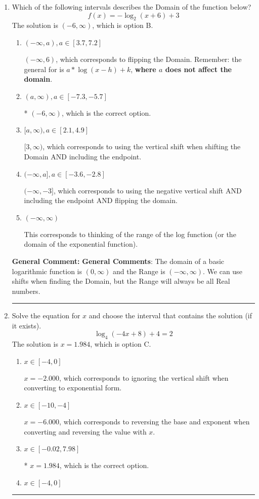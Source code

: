 \documentclass{extbook}[14pt]
\newcommand{\litem}[1]{\item #1

\rule{\textwidth}{0.4pt}}
\begin{document}
\begin{enumerate}\litem{
Which of the following intervals describes the Domain of the function below?
\[ f(x) = -\log_2{(x+6)}+3 \]The solution is \( (-6, \infty) \), which is option B.\begin{enumerate}[label=\Alph*.]
\item \( (-\infty, a), a \in [3.7, 7.2] \)

$(-\infty, 6)$, which corresponds to flipping the Domain. Remember: the general for is $a*\log(x-h)+k$, \textbf{where $a$ does not affect the domain}.
\item \( (a, \infty), a \in [-7.3, -5.7] \)

* $(-6, \infty)$, which is the correct option.
\item \( [a, \infty), a \in [2.1, 4.9] \)

$[3, \infty)$, which corresponds to using the vertical shift when shifting the Domain AND including the endpoint.
\item \( (-\infty, a], a \in [-3.6, -2.8] \)

$(-\infty, -3]$, which corresponds to using the negative vertical shift AND including the endpoint AND flipping the domain.
\item \( (-\infty, \infty) \)

This corresponds to thinking of the range of the log function (or the domain of the exponential function).
\end{enumerate}

\textbf{General Comment:} \textbf{General Comments}: The domain of a basic logarithmic function is $(0, \infty)$ and the Range is $(-\infty, \infty)$. We can use shifts when finding the Domain, but the Range will always be all Real numbers.
}
\litem{
Solve the equation for $x$ and choose the interval that contains the solution (if it exists).
\[ \log_{4}{(-4x+8)}+4 = 2 \]The solution is \( x = 1.984 \), which is option C.\begin{enumerate}[label=\Alph*.]
\item \( x \in [-4, 0] \)

$x = -2.000$, which corresponds to ignoring the vertical shift when converting to exponential form.
\item \( x \in [-10, -4] \)

$x = -6.000$, which corresponds to reversing the base and exponent when converting and reversing the value with $x$.
\item \( x \in [-0.02, 7.98] \)

* $x = 1.984$, which is the correct option.
\item \( x \in [-4, 0] \)


\end{enumerate}}
\end{enumerate}
\end{document}
